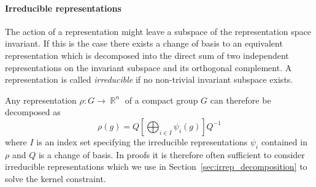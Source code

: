 \documentclass{article}
\DeclareMathOperator*{\R}{\mathbb{R}}
\begin{document}
\paragraph{Irreducible representations}
The action of a representation might leave a subspace of the representation space invariant.
If this is the case there exists a change of basis to an equivalent representation which is decomposed into the direct sum of two independent representations on the invariant subspace and its orthogonal complement.
A representation is called \textit{irreducible} if no non-trivial invariant subspace exists.

Any representation $\rho: G \to \R^n$ of a compact group $G$ can therefore be decomposed as
\[
    \rho(g) =
    Q
    \left[
    \bigoplus\nolimits_{i\in I}\psi_i(g)
    \right]
    Q^{-1}
\]
where $I$ is an index set specifying the irreducible representations $\psi_i$ contained in $\rho$ and $Q$ is a change of basis.
In proofs it is therefore often sufficient to consider irreducible representations which we use in Section~\ref{sec:irrep_decomposition} to solve the kernel constraint.
\end{document}
